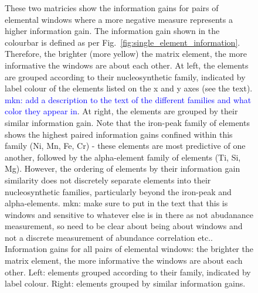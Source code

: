 \documentclass[a4paper,fleqn,usenatbib]{mnras}
\begin{document}
\begin{figure}
    \caption{These two matricies show the information gains for pairs of elemental windows where a more negative measure represents a higher information gain. The information gain shown in the colourbar is defined as per  Fig.~\ref{fig:single_element_information}. Therefore, the brighter (more yellow) the matrix element, the more informative the windows are about each other. At left, the elements are grouped according to their nucleosynthetic family, indicated by label colour of the elements listed on the x and y axes (see the text). \textcolor{blue}{mkn: add a description to the text of the different families and what color they appear in}. At right, the elements are grouped by their similar information gain. Note that the iron-peak family of elements shows the highest paired information gains confined within this family (Ni, Mn, Fe, Cr) - these elements are most predictive of one another, followed by the alpha-element family of elements (Ti, Si, Mg). However, the ordering of elements by their information gain similarity does not discretely separate elements into their nucleosynthetic families, particularly beyond the iron-peak and alpha-elements. {mkn: make sure to put in the text that this is windows and sensitive to whatever else is in there as not abudanance measurement, so need to be clear about being about windows and not a discrete measurement of abundance correlation etc.}. Information gains for all pairs of elemental windows: the brighter the matrix element, the more informative the windows are about each other. Left: elements grouped according to their family, indicated by label colour. Right: elements grouped by similar information gains.}
    \label{fig:single_element_errs}
\end{figure}
\end{document}
